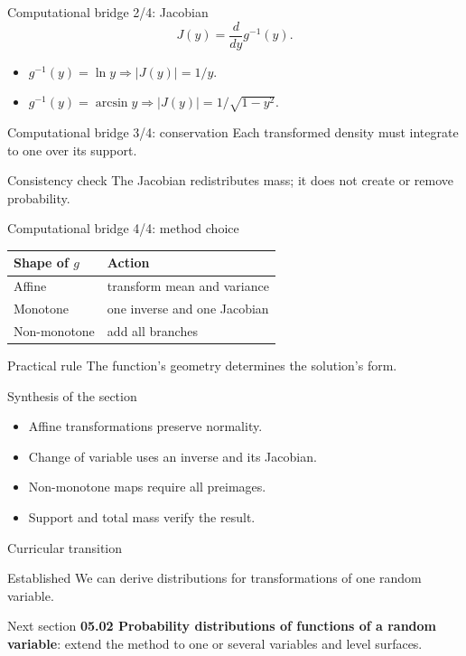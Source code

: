 \documentclass[10pt,aspectratio=169]{beamer}
\begin{document}
\begin{frame}{Computational bridge 2/4: Jacobian}
  \footnotesize
  \[
    J(y)=\frac{d}{dy}g^{-1}(y).
  \]
  \begin{itemize}\itemsep=0.12cm
    \item $g^{-1}(y)=\ln y\Rightarrow |J(y)|=1/y$.
    \item $g^{-1}(y)=\arcsin y\Rightarrow |J(y)|=1/\sqrt{1-y^2}$.
  \end{itemize}
\end{frame}

\begin{frame}{Computational bridge 3/4: conservation}
  \footnotesize
  Each transformed density must integrate to one over its support.
  \begin{block}{Consistency check}
    The Jacobian redistributes mass; it does not create or remove probability.
  \end{block}
\end{frame}

\begin{frame}{Computational bridge 4/4: method choice}
  \footnotesize
  \begin{tabular}{ll}
    \hline
    Shape of $g$ & Action \\
    \hline
    Affine & transform mean and variance \\
    Monotone & one inverse and one Jacobian \\
    Non-monotone & add all branches \\
    \hline
  \end{tabular}
  \begin{alertblock}{Practical rule}
    The function's geometry determines the solution's form.
  \end{alertblock}
\end{frame}

\begin{frame}{Synthesis of the section}
  \footnotesize
  \begin{itemize}\itemsep=0.12cm
    \item Affine transformations preserve normality.
    \item Change of variable uses an inverse and its Jacobian.
    \item Non-monotone maps require all preimages.
    \item Support and total mass verify the result.
  \end{itemize}
\end{frame}

\begin{frame}{Curricular transition}
  \footnotesize
  \begin{block}{Established}
    We can derive distributions for transformations of one random variable.
  \end{block}
  \begin{alertblock}{Next section}
    \textbf{05.02 Probability distributions of functions of a random variable}:
    extend the method to one or several variables and level surfaces.
  \end{alertblock}
\end{frame}
\end{document}
